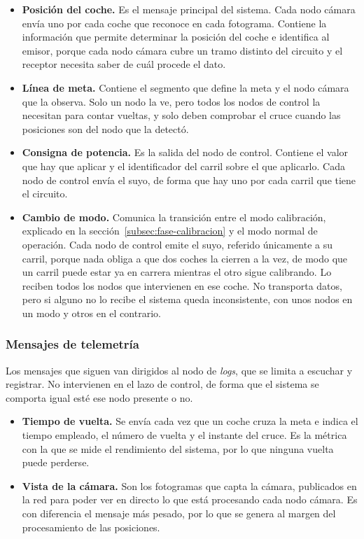 \begin{itemize}
	\item \textbf{Posición del coche.} Es el mensaje principal del sistema. Cada nodo cámara envía uno por cada coche que reconoce en cada fotograma. Contiene la información que permite determinar la posición del coche e identifica al emisor, porque cada nodo cámara cubre un tramo distinto del circuito y el receptor necesita saber de cuál procede el dato.

	\item \textbf{Línea de meta.} Contiene el segmento que define la meta y el nodo cámara que la observa. Solo un nodo la ve, pero todos los nodos de control la necesitan para contar vueltas, y solo deben comprobar el cruce cuando las posiciones son del nodo que la detectó.

	\item \textbf{Consigna de potencia.} Es la salida del nodo de control. Contiene el valor que hay que aplicar y el identificador del carril sobre el que aplicarlo. Cada nodo de control envía el suyo, de forma que hay uno por cada carril que tiene el circuito.

	\item \textbf{Cambio de modo.} Comunica la transición entre el modo calibración, explicado en la sección~\ref{subsec:fase-calibracion} y el modo normal de operación. Cada nodo de control emite el suyo, referido únicamente a su carril, porque nada obliga a que dos coches la cierren a la vez, de modo que un carril puede estar ya en carrera mientras el otro sigue calibrando. Lo reciben todos los nodos que intervienen en ese coche. No transporta datos, pero si alguno no lo recibe el sistema queda inconsistente, con unos nodos en un modo y otros en el contrario.
\end{itemize}

\subsubsection{Mensajes de telemetría}

Los mensajes que siguen van dirigidos al nodo de \emph{logs}, que se limita a escuchar y registrar. No intervienen en el lazo de control, de forma que el sistema se comporta igual esté ese nodo presente o no.

\begin{itemize}
	\item \textbf{Tiempo de vuelta.} Se envía cada vez que un coche cruza la meta e indica el tiempo empleado, el número de vuelta y el instante del cruce. Es la métrica con la que se mide el rendimiento del sistema, por lo que ninguna vuelta puede perderse.

	\item \textbf{Vista de la cámara.} Son los fotogramas que capta la cámara, publicados en la red para poder ver en directo lo que está procesando cada nodo cámara. Es con diferencia el mensaje más pesado, por lo que se genera al margen del procesamiento de las posiciones.
\end{itemize}

